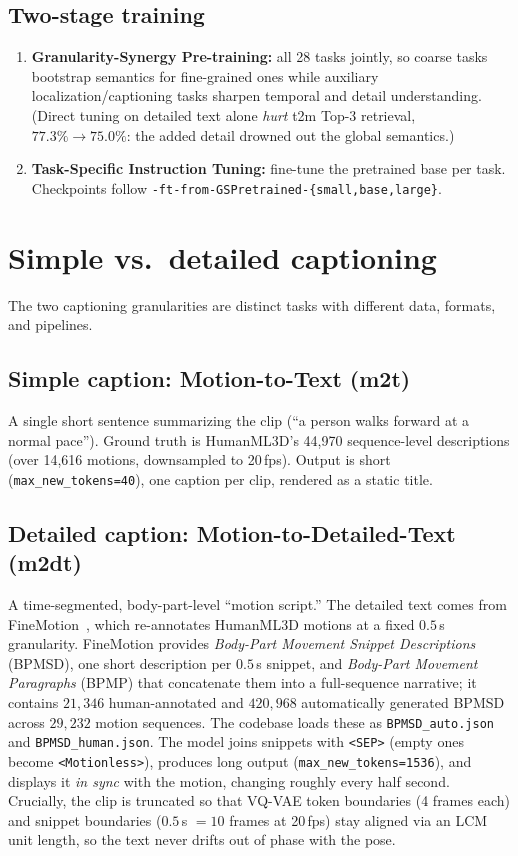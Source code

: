\documentclass[10pt,twocolumn]{article}
\newcommand{\code}[1]{\texttt{\small #1}}
\begin{document}
\subsection{Two-stage training}
\begin{enumerate}
  \item \textbf{Granularity-Synergy Pre-training:} all 28 tasks jointly, so coarse tasks bootstrap
        semantics for fine-grained ones while auxiliary localization/captioning tasks sharpen
        temporal and detail understanding. (Direct tuning on detailed text alone \emph{hurt} t2m
        Top-3 retrieval, $77.3\%\!\rightarrow\!75.0\%$: the added detail drowned out the global
        semantics.)
  \item \textbf{Task-Specific Instruction Tuning:} fine-tune the pretrained base per task.
        Checkpoints follow \code{*-ft-from-GSPretrained-\{small,base,large\}}.
\end{enumerate}

\section{Simple vs.\ detailed captioning}
The two captioning granularities are distinct tasks with different data, formats, and pipelines.

\subsection{Simple caption: Motion-to-Text (m2t)}
A single short sentence summarizing the clip (``a person walks forward at a normal pace''). Ground
truth is HumanML3D's 44{,}970 sequence-level descriptions (over 14{,}616 motions, downsampled to
20\,fps). Output is short (\code{max\_new\_tokens=40}), one caption per clip, rendered as a static
title.

\subsection{Detailed caption: Motion-to-Detailed-Text (m2dt)}
A time-segmented, body-part-level ``motion script.'' The detailed text comes from
FineMotion~\cite{finemotion}, which re-annotates HumanML3D motions at a fixed $0.5$\,s granularity.
FineMotion provides \emph{Body-Part Movement Snippet Descriptions} (BPMSD), one short
description per $0.5$\,s snippet, and \emph{Body-Part Movement Paragraphs} (BPMP) that
concatenate them into a full-sequence narrative; it contains $21{,}346$ human-annotated and
$420{,}968$ automatically generated BPMSD across $29{,}232$ motion sequences. The codebase loads
these as \code{BPMSD\_auto.json} and \code{BPMSD\_human.json}. The model joins snippets with
\code{<SEP>} (empty ones become \code{<Motionless>}), produces long output
(\code{max\_new\_tokens=1536}), and displays it \emph{in sync} with the motion, changing roughly
every half second. Crucially, the clip is truncated so that VQ-VAE token boundaries (4 frames each)
and snippet boundaries ($0.5$\,s $=10$ frames at 20\,fps) stay aligned via an LCM unit length, so
the text never drifts out of phase with the pose.
\end{document}
